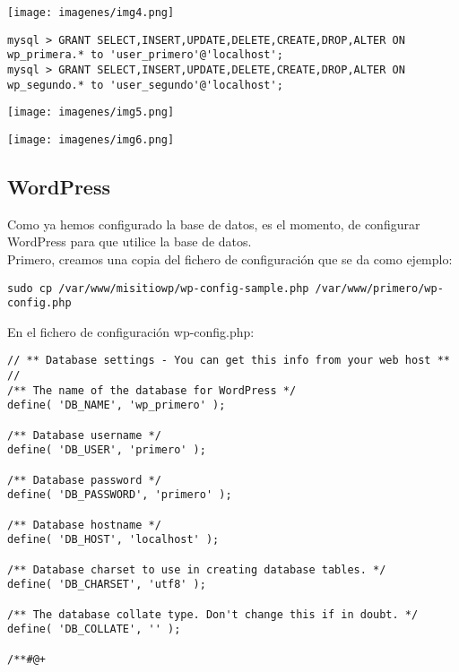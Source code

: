 \documentclass{article}
\begin{document}
\begin{center}
\texttt{[image: imagenes/img4.png]} 
\end{center}
 
\begin{lstlisting}[frame=single] 
mysql > GRANT SELECT,INSERT,UPDATE,DELETE,CREATE,DROP,ALTER ON wp_primera.* to 'user_primero'@'localhost';
mysql > GRANT SELECT,INSERT,UPDATE,DELETE,CREATE,DROP,ALTER ON wp_segundo.* to 'user_segundo'@'localhost';
\end{lstlisting}

\begin{center}
\texttt{[image: imagenes/img5.png]} 
\end{center}
\begin{center}
\texttt{[image: imagenes/img6.png]} 
\end{center}

\subsection{WordPress}
Como ya hemos configurado la base de datos, es el momento, de configurar WordPress para que utilice la base de datos.\\
Primero, creamos una copia del fichero de configuración que se da como ejemplo:

\begin{lstlisting}[frame=single] 
sudo cp /var/www/misitiowp/wp-config-sample.php /var/www/primero/wp-config.php
\end{lstlisting}
\begin{flushleft}
En el fichero de configuración wp-config.php:
\end{flushleft}

\begin{lstlisting}[frame=single] 
// ** Database settings - You can get this info from your web host ** //
/** The name of the database for WordPress */
define( 'DB_NAME', 'wp_primero' );

/** Database username */
define( 'DB_USER', 'primero' );

/** Database password */
define( 'DB_PASSWORD', 'primero' );

/** Database hostname */
define( 'DB_HOST', 'localhost' );

/** Database charset to use in creating database tables. */
define( 'DB_CHARSET', 'utf8' );

/** The database collate type. Don't change this if in doubt. */
define( 'DB_COLLATE', '' );

/**#@+

\end{lstlisting}
\end{document}

